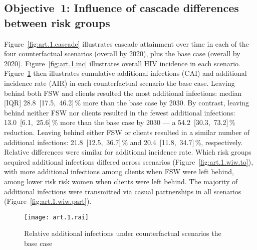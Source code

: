 \subsection*{Objective~1: Influence of cascade differences between risk groups}\label{res.obj.1}
Figure~\ref{fig:art.1.cascade} illustrates cascade attainment over time
in each of the four counterfactual scenarios (\casmd overall by 2020),
plus the base case (\cashi overall by 2020).
Figure~\ref{fig:art.1.inc} illustrates overall HIV incidence in each scenario.
Figure~\ref{fig:art.1.rai} then illustrates
cumulative additional infections (CAI) and additional incidence rate (AIR)
in each counterfactual scenario \vs the base case.
Leaving behind both FSW and clients resulted the most additional infections: median [IQR]
28.8~[17.5,~46.2]\,\% more than the base case by 2030. %
By contrast, leaving behind neither FSW nor clients resulted in the fewest additional infections:
13.0~[6.1,~25.6]\,\% more than the base case by 2030 --- %
a 54.2~[30.3,~73.2]\,\% reduction. %
Leaving behind either FSW or clients resulted in a similar number of additional infections:
21.8~[12.5,~36.7]\,\% and 20.4~[11.8,~34.7]\,\%, respectively. %
Relative differences were similar for additional incidence rate.
Which risk groups acquired additional infections differed across scenarios
(Figure~\ref{fig:art.1.wiw.to}),
with more additional infections among clients when FSW were left behind,
\vs among lower risk risk women when clients were left behind.
The majority of additional infections were transmitted
via casual partnerships in all scenarios (Figure~\ref{fig:art.1.wiw.part}). %
\begin{figure}[h]
  \centering\texttt{[image: art.1.rai]}
  \caption{Relative additional infections under counterfactual scenarios \vs the base case}
  \label{fig:art.1.rai}
\end{figure}
